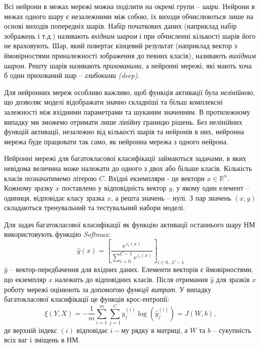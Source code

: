 \documentclass[14pt,a4paper]{extarticle}
\newcounter{e}
\numberwithin{equation}{section}
\numberwithin{figure}{section}
\begin{document}
 
 Всі нейрони в межах мережі можна поділити на окремі групи -- \textit{шари}. Нейрони в межах одного шару є незалежними між собою, їх виходи обчислюються лише на основі виходів попередніх шарів. Набір початкових даних (наприклад набір зображень і т.д.) називають \textit{вхідним шаром} і при обчисленні кількості шарів його не враховують. Шар, який повертає кінцевий результат (наприклад вектор з ймовірностями приналежності зображення до певних класів), називають \textit{вихідним шаром}. Решту шарів називають \textit{прихованими}, а нейронні мережі, які мають хоча б один прихований шар -- \textit{глибокими (deep)}.
 
 Для нейронних мереж особливо важливо, щоб функція активації була \textit{нелінійною}, що дозволяє моделі відображати значно складніші та більш комплексні залежності між вхідними параметрами та шуканим значенням. В протилежному випадку ми зможемо отримати лише лінійну границю рішень. Без нелінійних функцій активації, незалежно від кількості шарів та нейронів в них, нейронна мережа буде працювати так само, як нейронна мережа з одного нейрона.
 
 Нейронні мережі для багатокласової класифікації займаються задачами, в яких невідома величина може належати до одного з двох або більше класів. Кількість класів позначатимемо літерою $C$. Вхідні екземпляри - це вектори $x\in\mathbb{R}^n$. Кожному зразку $x$ поставлено у відповідність вектор $y$, у якому один елемент -- одиниця, відповідає класу зразка $x$, а решта значень -- нулі. З пар значень $(x, y)$ складаються тренувальний та тестувальний набори моделі.
 
 Для задач багатокласової класифікації як функцію активації останнього шару НМ використовують функцію \textit{Softmax}:
 \begin{equation}
	\label{softmax}
	\hat{y}(x)=\left[\frac{e^{z_{i}(x)}}{\sum\limits_{i=0}^{C-1} e^{z_{i}(x)}}\right]_{i \in 0 \dots C-1}
 \end{equation}
 $\hat{y}$ -- вектор-передбачення для вхідних даних. Елементи векторів є ймовірностями, що екземпляр $x$ належить до відповідних класів. Після отримання $\hat{y}$ для зразків $x$ роботу мережі оцінюють за допомогою \textit{функції витрат}. У випадку багатокласової класифікації це функція крос-ентропії:
 \begin{equation}
 \xi(Y, X)=-\frac{1}{m} \sum_{i=1}^{m} \sum_{j=1}^{C} y_{j}^{(i)} \log \left(\hat{y}_{j}^{(i)}\right)=J(W, b),
 \label{cost}
 \end{equation}
 де верхній індекс $(i)$ відповідає $i-$му рядку в матриці, а $W$ та $b$ -- сукупність всіх ваг і зміщень в НМ.
 
\end{document}

